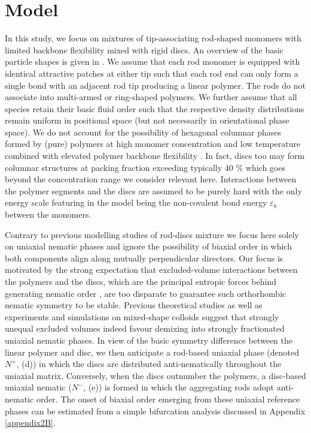\section{Model}


In this study, we focus on mixtures of tip-associating rod-shaped monomers with limited backbone flexibility  mixed with rigid discs. An overview of the basic particle shapes is given in . We assume that each rod monomer is equipped with identical attractive patches at either tip such that each rod end can only form a single bond  with an adjacent rod tip producing a linear polymer. The rods do not associate into multi-armed or ring-shaped polymers. We further assume that all species retain their basic fluid order such that the respective density distributions remain uniform in positional space (but not necessarily in orientational phase space). We do not account for the possibility of hexagonal columnar phases formed by (pure) polymers at high monomer concentration and low temperature combined with elevated polymer backbone flexibility  \cite{taylorherzfeld1991,schoot1996}. In fact, discs too may form columnar structures at packing fraction exceeding typically 40 \% \cite{frenkelcol1989,veerman1992,kooij_nature2000} which goes beyond the concentration range we consider relevant here.  Interactions between the polymer segments and the discs are assumed to be purely hard with the only energy scale featuring in the model being the non-covalent bond energy $\varepsilon_{b}$ between the monomers.

 Contrary to previous modelling studies of rod-discs mixture we focus here solely on uniaxial nematic phases and ignore the possibility of biaxial order in which both components align along mutually perpendicular directors. Our focus is motivated by the strong expectation that excluded-volume interactions between the polymers and the discs, which are the principal entropic forces behind generating nematic order \cite{onsager1949}, are too disparate to guarantee such orthorhombic nematic symmetry to be stable. Previous theoretical studies \cite{jacksonbiaxrev,varga2002,jacksonbiax,wensinkrodplate,wensinkbiaxial} as well as experiments \cite{kooijlangmuir2000,kooijprl2000,woolston2015} and simulations \cite{campallenbolhuisfrenkel,galindo1,galindo2} on mixed-shape colloids  suggest that strongly unequal excluded volumes indeed favour demixing into strongly fractionated uniaxial nematic phases.  In view of the basic symmetry difference  between the linear polymer and disc, we  then anticipate a rod-based uniaxial phase (denoted $N^{+}$,  (d)) in which the discs are distributed  anti-nematically throughout the uniaxial matrix. Conversely, when the discs outnumber the polymers,  a disc-based uniaxial nematic ($N^{-}$,   (e)) is formed in which the aggregating rods adopt anti-nematic order. The onset of biaxial order emerging from these uniaxial reference phases can be estimated from a simple bifurcation analysis discussed in Appendix \ref{appendix2B}.
 
